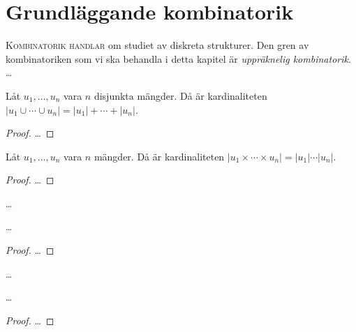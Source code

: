 %
%
%

\chapter{Grundläggande kombinatorik}
\label{GrundläggandeKombinatorik}
\lettrine{K}{ombinatorik handlar} om studiet av diskreta strukturer.
Den gren av kombinatoriken som vi ska behandla i detta kapitel är 
\emph{uppräknelig kombinatorik}.
\dots

\begin{lemma}[Additionsprincipen]
\label{Additionsprincipen}
  Låt \(u_1, \dots, u_n\) vara \(n\) disjunkta mängder.
  Då är kardinaliteten \(|u_1\cup \cdots\cup u_n| = |u_1| + \cdots + |u_n|\).
\end{lemma}
\begin{proof}
  \dots
\end{proof}

\begin{lemma}[Multiplikationsprincipen]
\label{Multiplikationsprincipen}
  Låt \(u_1, \dots, u_n\) vara \(n\) mängder.
  Då är kardinaliteten \(|u_1\times \cdots\times u_n| = |u_1|\cdots |u_n|\).
\end{lemma}
\begin{proof}
  \dots
\end{proof}

\begin{definition}[Permutation]
\label{Permutation}
  \dots
\end{definition}

\begin{theorem}
\label{AntaletPermutationer}
  \dots
\end{theorem}
\begin{proof}
  \dots
\end{proof}

\begin{definition}[Kombination]
\label{Kombination}
  \dots
\end{definition}

\begin{theorem}
\label{AntaletKombinationer}
  \dots
\end{theorem}
\begin{proof}
  \dots
\end{proof}

